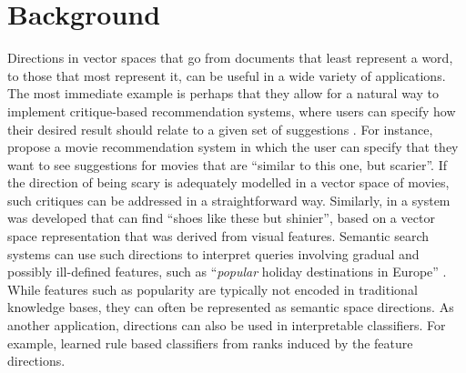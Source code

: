  


\section{Background}

Directions in vector spaces that go from documents that least represent a word, to those that most represent it, can be useful in a wide variety of applications. The most immediate example is perhaps that they allow for a natural way to implement critique-based recommendation systems, where users can specify how their desired result should relate to a given set of suggestions \cite{Viappiani2006}. For instance, \cite{Vig2014} propose a movie recommendation system in which the user can specify that they want to see suggestions for movies that are ``similar to this one, but scarier''. If the direction of being scary is adequately modelled in a vector space of movies, such critiques can be addressed in a straightforward way. Similarly, in \cite{Kovashka} a system was developed that can find ``shoes like these but shinier'', based on a vector space representation that was derived from visual features. Semantic search systems can use such directions to interpret queries involving gradual and possibly ill-defined features, such as ``\emph{popular} holiday destinations in Europe'' \cite{Jameel}. While features such as popularity are typically not encoded in traditional knowledge bases, they can often be represented as semantic space directions.  As another application, directions can also be used in interpretable classifiers. For example, \cite{Derrac2015} learned rule based classifiers from ranks induced by the feature directions.

